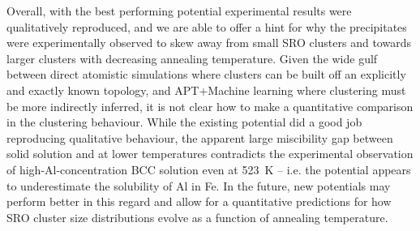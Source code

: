 Overall, with the best performing potential experimental results were qualitatively reproduced, and we are able to offer a hint for why the \DOTHREE precipitates were experimentally observed to skew away from small SRO clusters and towards larger clusters with decreasing annealing temperature.
Given the wide gulf between direct atomistic simulations where clusters can be built off an explicitly and exactly known topology, and APT+Machine learning where clustering must be more indirectly inferred, it is not clear how to make a quantitative comparison in the clustering behaviour.
While the existing potential did a good job reproducing qualitative behaviour, the apparent large miscibility gap between solid solution and \DOTHREE at lower temperatures contradicts the experimental observation of high-Al-concentration BCC solution even at 523~K -- i.e. the potential appears to underestimate the solubility of Al in Fe.
In the future, new potentials may perform better in this regard and allow for a quantitative predictions for how SRO cluster size distributions evolve as a function of annealing temperature.
